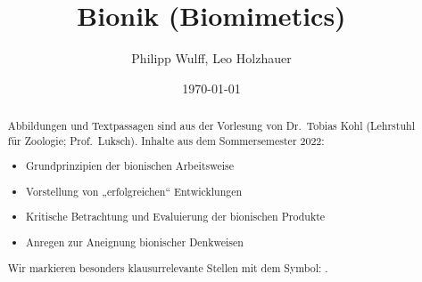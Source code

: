 \documentclass[10pt]{article}
\title{Bionik (Biomimetics)}
\author{Philipp Wulff, Leo Holzhauer}
\date{\today}
\newcommand\dangersign[1][2ex]{%
  \scaleto{\stackengine{0.3pt}{\scalebox{1.2}[0.9]{%
  \color{red}$\blacktriangle$}}{\tiny\bfseries !}{O}{c}{F}{F}{L}}{#1}%
}
\begin{document}
\maketitle \tableofcontents 

\begin{abstract}
    Abbildungen und Textpassagen sind aus der Vorlesung von Dr.\ Tobias Kohl (Lehrstuhl für Zoologie; Prof.\ Luksch). Inhalte aus dem Sommersemester 2022:
    \begin{itemize}
    	\item Grundprinzipien der bionischen Arbeitsweise
    	\item Vorstellung von „erfolgreichen“ Entwicklungen
    	\item Kritische Betrachtung und Evaluierung der bionischen Produkte
     	\item Anregen zur Aneignung bionischer Denkweisen
    \end{itemize}
    Wir markieren besonders klausurrelevante Stellen mit dem Symbol: \dangersign[3ex].
\end{abstract}










\end{document}

